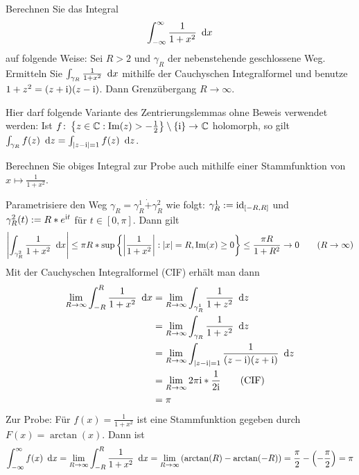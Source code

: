 \begin{exercisePage}
		
	\begin{task}
		Berechnen Sie das Integral
		\begin{equation*}
			\int_{-\infty}^\infty \frac{1}{1 + x^2} \enskip \mathrm{d}x
		\end{equation*}
		auf folgende Weise: Sei $R > 2$ und $\gamma_R$ der nebenstehende geschlossene Weg. Ermitteln Sie $\int_{\gamma_R} \frac{1}{1 + x^2} \enskip \mathrm{d}x$ mithilfe der Cauchyschen Integralformel und benutze $1 + z^2 = (z+\mathrm{i}) (z - \mathrm{i})$. Dann Grenzübergang $R \to \infty$. 
		
		Hier darf folgende Variante des Zentrierungslemmas ohne Beweis verwendet werden: Ist $\abb{f}{\menge{z \in \CC : \Im(z) > -\frac{1}{2}} \setminus \menge{\i}}{\CC}$ holomorph, so gilt $\int_{\gamma_R} f(z) \enskip \mathrm{d}z = \int_{\left| z-\mathrm{i} \right| = 1} f(z) \enskip \mathrm{d}z$.
		
		Berechnen Sie obiges Integral zur Probe auch mithilfe einer Stammfunktion von $x \mapsto \frac{1}{1 + x^2}$.
	\end{task}

	Parametrisiere den Weg $\gamma_R = \gamma_R^1 \dot{+} \gamma_R^2$ wie folgt: $\gamma_R^1 \mathrel{:=} \operatorname{id}_{[-R,R]}$ und $\gamma_R^2(t) \mathrel{:=} R*e^{\mathrm{i} t}$ für $t \in [0,\pi]$. Dann gilt 
	\begin{equation*}
		\left| \int_{\gamma_R^2} \frac{1}{1+x^2} \enskip \mathrm{d}x \right| \le \pi R * \sup\left\{ \left| \frac{1}{1+x^2} \right| : \left| x \right|=R, \operatorname{Im}(x) \ge 0 \right\} \le \frac{\pi R}{1 + R^2} \to 0 \tag{$R \to \infty$}
	\end{equation*}
	Mit der Cauchyschen Integralformel (CIF) erhält man dann
	\begin{align*}
		\lim_{R \to \infty} \int_{-R}^R \frac{1}{1 + x^2} \enskip \mathrm{d}x 
		&= \lim_{R \to \infty} \int_{\gamma_R^1} \frac{1}{1 + z^2} \enskip \mathrm{d}z \\
		&= \lim_{R \to \infty} \int_{\gamma_R} \frac{1}{1 + z^2} \enskip \mathrm{d}z \\
		&= \lim_{R \to \infty} \int_{\left| z - \mathrm{i} \right| = 1} \frac{1}{(z- \mathrm{i})(z + \mathrm{i})} \enskip \mathrm{d}z \\
		&= \lim_{R \to \infty} 2\pi \mathrm{i} * \frac{1}{2\mathrm{i}}  \tag{CIF} \\
		&= \pi
	\end{align*}
	Zur Probe: Für $f(x) = \frac{1}{1 + x^2}$ ist eine Stammfunktion gegeben durch $F(x) = \arctan(x)$. Dann ist
	\begin{equation*}
		\int_{-\infty}^\infty f(x) \enskip \mathrm{d}x = \lim_{R \to \infty} \int_{-R}^R \frac{1}{1 + x^2} \enskip \mathrm{d}x = \lim_{R \to \infty} \left( \arctan(R) - \arctan(-R) \right) = \frac{\pi}{2} - \left( -\frac{\pi}{2} \right) = \pi
	\end{equation*}


\end{exercisePage}
